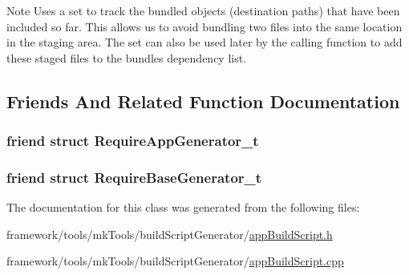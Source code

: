 \begin{DoxyNote}{Note}
Uses a set to track the bundled objects (destination paths) that have been included so far. This allows us to avoid bundling two files into the same location in the staging area. The set can also be used later by the calling function to add these staged files to the bundle\textquotesingle{}s dependency list. 
\end{DoxyNote}


\subsection{Friends And Related Function Documentation}
\subsubsection[{\texorpdfstring{Require\+App\+Generator\+\_\+t}{RequireAppGenerator_t}}]{\setlength{\rightskip}{0pt plus 5cm}friend struct {\bf Require\+App\+Generator\+\_\+t}\hspace{0.3cm}{\ttfamily [friend]}}\hypertarget{classninja_1_1_app_build_script_generator__t_a91562bfdee7b8bee558845b780facf51}{}\label{classninja_1_1_app_build_script_generator__t_a91562bfdee7b8bee558845b780facf51}
\subsubsection[{\texorpdfstring{Require\+Base\+Generator\+\_\+t}{RequireBaseGenerator_t}}]{\setlength{\rightskip}{0pt plus 5cm}friend struct {\bf Require\+Base\+Generator\+\_\+t}\hspace{0.3cm}{\ttfamily [friend]}}\hypertarget{classninja_1_1_app_build_script_generator__t_ab9382de245c70f2507eecb5feb3d6663}{}\label{classninja_1_1_app_build_script_generator__t_ab9382de245c70f2507eecb5feb3d6663}


The documentation for this class was generated from the following files\+:\begin{DoxyCompactItemize}
\item 
framework/tools/mk\+Tools/build\+Script\+Generator/\hyperlink{app_build_script_8h}{app\+Build\+Script.\+h}\item 
framework/tools/mk\+Tools/build\+Script\+Generator/\hyperlink{app_build_script_8cpp}{app\+Build\+Script.\+cpp}\end{DoxyCompactItemize}
